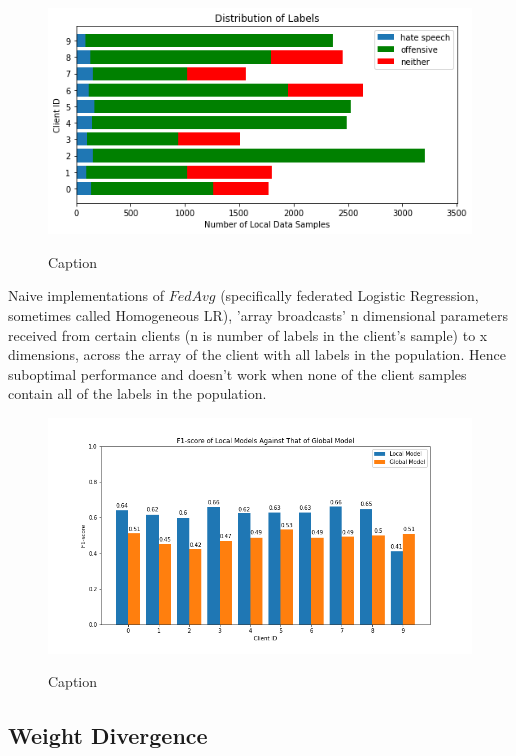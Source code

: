 \documentclass[letterpaper]{article} %
\begin{document}
\begin{figure}[h]
{\includegraphics[width=\columnwidth]{noniid-distribution-based-label-imbalance_distribution_of_labels_2}}
\caption{Caption}
\end{figure}

Naive implementations of $FedAvg$ (specifically federated Logistic Regression, sometimes called Homogeneous LR), 'array broadcasts' n dimensional parameters received from certain clients (n is number of labels in the client's sample) to x dimensions, across the array of the client with all labels in the population. Hence suboptimal performance and doesn't work when none of the client samples contain all of the labels in the population.

\begin{figure}[h]
{\includegraphics[width=\columnwidth]{noniid-distribution-based-label-imbalance_seed_2performance_of_models_on_client_data_f1score}}
\caption{Caption}
\end{figure}

\subsection{Weight Divergence}
\end{document}
